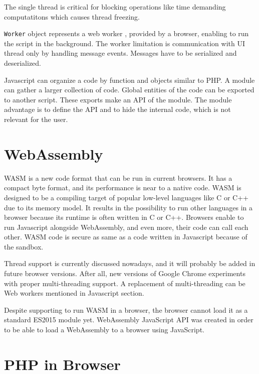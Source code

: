The single thread is critical for blocking operations like time demanding computatitons which causes thread freezing.
\par
\texttt{Worker} object represents a web worker \cite{online:workers}, provided by a browser, enabling to run the script in the background.
The worker limitation is communication with UI thread only by handling message events. 
Messages have to be serialized and deserialized.
\par
Javascript can organize a code by function and objects similar to PHP.
A module can gather a larger collection of code.
Global entities of the code can be exported to another script.
These exports make an API of the module.
The module advantage is to define the API and to hide the internal code, which is not relevant for the user.

\section{WebAssembly}

WASM \cite{online:wasmConcepts} is a new code format that can be run in current browsers. 
It has a compact byte format, and its performance is near to a native code. 
WASM is designed to be a compiling target of popular low-level languages like C or C++ due to its memory model.
It results in the possibility to run other languages in a browser because its runtime is often written in C or C++.
Browsers enable to run Javascript alongside WebAssembly, and even more, their code can call each other.
WASM code is secure as same as a code written in Javascript because of the sandbox. 
\par
Thread \cite{online:wasmThreads} support is currently discussed nowadays, and it will probably be added in future browser versions.
After all, new versions of Google Chrome experiments with proper multi-threading support.
A replacement of multi-threading can be Web workers mentioned in Javascript section.
\par
Despite supporting to run WASM in a browser, the browser cannot load it as a standard ES2015 module yet.
WebAssembly JavaScript API was created in order to be able to load a WebAssembly to a browser using JavaScript.

\section{PHP in Browser}

